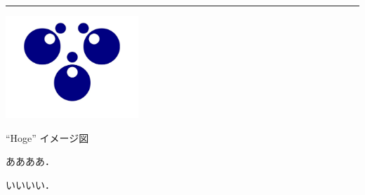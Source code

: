 \documentclass[9pt,a4paper]{ltjsarticle}                %
\begin{document}
\begin{multicols}{2}

\begin{Figure}
    \centering
    \iffigure
    \rule{50mm}{30mm}
    \includegraphics[width=50mm]{./img/hoge.pdf}
    \fi
    \captionsetup{type=figure}
    \caption{``Hoge'' イメージ図}
\end{Figure}




ああああ．


いいいい．



\end{multicols}
\end{document}

